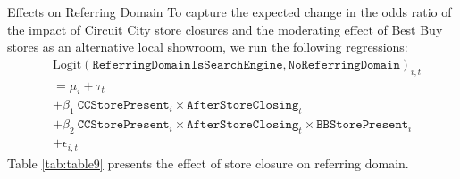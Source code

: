 \documentclass[mathserif, xcolor=table]{beamer}
\begin{document}
\begin{frame}[allowframebreaks]{Effects on Referring Domain}
	To capture the expected change in the odds ratio of the impact of Circuit City store closures and
	the moderating effect of Best Buy stores as an alternative local showroom, we run the following regressions:
	\begin{equation}
		\begin{aligned}
			& \textrm{Logit}\left( \texttt{ReferringDomainIsSearchEngine}, \texttt{NoReferringDomain} \right)_{i,t} \\ &= \mu_{i} + \tau_{t} 
			\\ &+ \beta_1 \ \texttt{CCStorePresent}_i \times \texttt{AfterStoreClosing}_t 
			\\ &+ \beta_2 \ \texttt{CCStorePresent}_i \times \texttt{AfterStoreClosing}_t \times \texttt{BBStorePresent}_i \\ & + \epsilon_{i,t}
		\end{aligned}
	\end{equation}
	\framebreak
	Table \ref{tab:table9} presents the effect of store closure on referring domain.
	\begin{table}[!h] \centering 
		\caption{Results of Logistic Regression for Referring Domain} 
		\label{tab:table9} 
	\end{table}
\end{frame}
\end{document}
